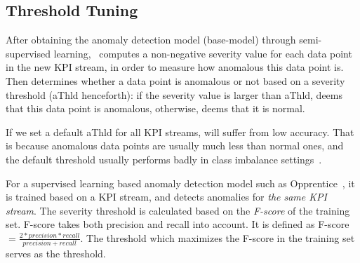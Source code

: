




 \subsection{Threshold Tuning}
 \label{subsubsec:choose_threshold}
 After obtaining the anomaly detection model (base-model) through semi-supervised learning, \name~computes a non-negative severity value for each data point in the new KPI stream, in order to measure how anomalous this data point is. 
 Then \name{} determines whether a data point is anomalous or not based on a severity threshold (aThld henceforth): if the severity value is larger than aThld, \name{} deems that this data point is anomalous, otherwise, \name{} deems that it is normal.


If we set a default aThld for all KPI streams, \name{} will suffer from low accuracy.
That is because anomalous data points are usually much less than normal ones, and the default threshold usually performs badly in class imbalance settings~\cite{he2008learning}.

For a supervised learning based anomaly detection model such as Opprentice~\cite{liu2015opprentice}, it is trained based on a KPI stream, and detects anomalies for \emph{the same KPI stream}.
The severity threshold is calculated based on the \emph{F-score} of the training set.
F-score takes both precision and recall into account. 
It is defined as F-score $=\frac{2*precision*recall}{precision+recall}$. 
The threshold which maximizes the F-score in the training set serves as the threshold.

